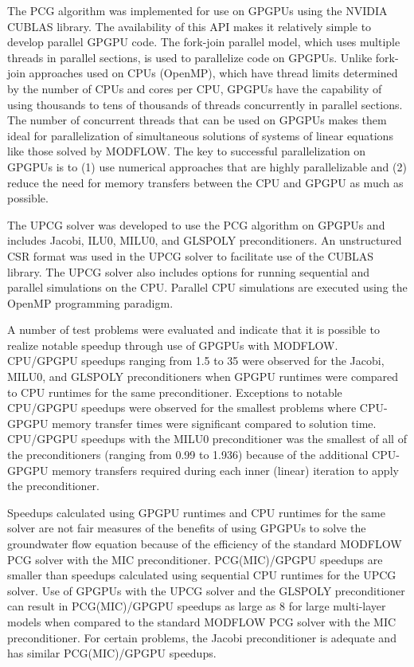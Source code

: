 \documentclass[12pt]{article}
\begin{document}
The PCG algorithm was implemented for use on GPGPUs using the NVIDIA \color{blue}CUBLAS library\color{black}. The availability of this API makes it relatively simple to develop parallel GPGPU code. The fork-join parallel model, which uses multiple threads in parallel sections, is used to parallelize code on GPGPUs. Unlike fork-join approaches used on CPUs (OpenMP), which have thread limits determined by the number of CPUs and cores per CPU, GPGPUs have the capability of using thousands to tens of thousands of threads concurrently in parallel sections. The number of concurrent threads that can be used on GPGPUs makes them ideal for parallelization of simultaneous solutions of systems of linear equations like those solved by MODFLOW. The key to successful parallelization on GPGPUs is to (1) use numerical approaches that are highly parallelizable and (2) reduce the need for memory transfers between the CPU and GPGPU as much as possible.

The UPCG solver was developed to \color{blue}use \color{black} the PCG algorithm on GPGPUs and includes Jacobi, ILU0, MILU0, and GLSPOLY preconditioners. An unstructured CSR format was used in the UPCG solver to facilitate use of the CUBLAS library. The UPCG solver also includes options for running sequential and parallel simulations on the CPU. Parallel CPU simulations are executed using the OpenMP programming paradigm.

A number of test problems were evaluated and indicate that it is possible to realize notable speedup through use of GPGPUs with MODFLOW.  CPU/GPGPU speedups ranging from 1.5 to 35 were observed for the Jacobi, MILU0, and GLSPOLY preconditioners when GPGPU runtimes were compared to CPU runtimes for the same preconditioner. Exceptions to notable CPU/GPGPU speedups were observed for the smallest problems where CPU-GPGPU memory transfer times were significant compared to solution time. CPU/GPGPU speedups with the MILU0 preconditioner was the smallest of all of the preconditioners (ranging from 0.99 to 1.936) because of the additional CPU-GPGPU memory transfers required during each inner (linear) iteration to apply the preconditioner.

Speedups calculated using GPGPU runtimes and CPU runtimes for the same solver are not fair measures of the benefits of using GPGPUs to solve the groundwater flow equation because of the efficiency of the standard MODFLOW PCG solver with the MIC preconditioner. PCG(MIC)/GPGPU speedups are smaller than speedups calculated using sequential CPU runtimes for the UPCG solver. Use of GPGPUs with the UPCG solver and the GLSPOLY preconditioner can result in PCG(MIC)/GPGPU speedups as large as 8 for large multi-layer models when compared to the standard MODFLOW PCG solver with the MIC preconditioner. For certain problems, the Jacobi preconditioner is adequate and has similar PCG(MIC)/GPGPU speedups.
\end{document}
